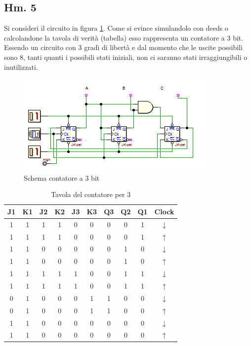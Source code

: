 \documentclass[journal, a4paper]{IEEEtran}
\begin{document}
\subsection{Hm. 5}

Si consideri il circuito in figura \ref{fig:count3}. Come si evince simulandolo con deeds o calcolandone la tavola di verità (tabella) esso rappresenta un contatore a 3 bit. Essendo un circuito con 3 gradi di libertà e dal momento che le uscite possibili sono 8, tanti quanti i possibili stati iniziali, non ci saranno stati irraggiungibili o inutilizzati.

\begin{figure}[htp]
\centering
\includegraphics[scale=.8]{hm5}
\caption{Schema contatore a 3 bit}
\label{fig:count3}
\end{figure}

\begin{table}[htp]
\centering
\caption{Tavola del contatore per 3}
\label{tab:count3}
\begin{tabular}{|c|c|c|c|c|c|c|c|c|c|}
\hline
J1 & K1 & J2 & K2 & J3 & K3 & Q3 & Q2 & Q1 & Clock \\ 
\hline 
1 & 1 & 1 & 1 & 0 & 0 & 0 & 0 & 1 & $\downarrow$ \\ 
\hline 
1 & 1 & 1 & 1 & 0 & 0 & 0 & 0 & 1 & $\uparrow$ \\ 
\hline 
1 & 1 & 0 & 0 & 0 & 0 & 0 & 1 & 0 & $\downarrow$ \\ 
\hline 
1 & 1 & 0 & 0 & 0 & 0 & 0 & 1 & 0 & $\uparrow$ \\ 
\hline
1 & 1 & 1 & 1 & 1 & 0 & 0 & 1 & 1 & $\downarrow$ \\ 
\hline 
1 & 1 & 1 & 1 & 1 & 0 & 0 & 1 & 1 & $\uparrow$ \\ 
\hline
0 & 1 & 0 & 0 & 0 & 1 & 1 & 0 & 0 & $\downarrow$ \\ 
\hline 
0 & 1 & 0 & 0 & 0 & 1 & 1 & 0 & 0 & $\uparrow$ \\ 
\hline 
1 & 1 & 0 & 0 & 0 & 0 & 0 & 0 & 0 & $\downarrow$ \\ 
\hline 
1 & 1 & 0 & 0 & 0 & 0 & 0 & 0 & 0 & $\uparrow$ \\ 
\hline
\end{tabular} 
\end{table}
\end{document}
